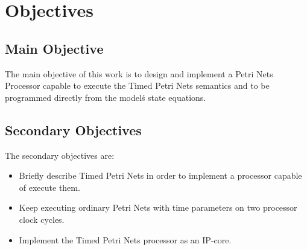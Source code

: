 \section{Objectives}

	\subsection{Main Objective}
	
		The main objective of this work is to design and implement a Petri Nets Processor capable 
		to execute the Timed Petri Nets semantics and to be programmed directly from the model\'s 
		state equations.
	
	\subsection{Secondary Objectives}
	
		The secondary objectives are:
		\begin{itemize}
		  	\item Briefly describe Timed Petri Nets in order to implement a processor capable of execute 
		  		them.
		  	\item Keep executing ordinary Petri Nets with time parameters on two processor clock cycles.
		  	\item Implement the Timed Petri Nets processor as an IP-core.
		\end{itemize}
		
